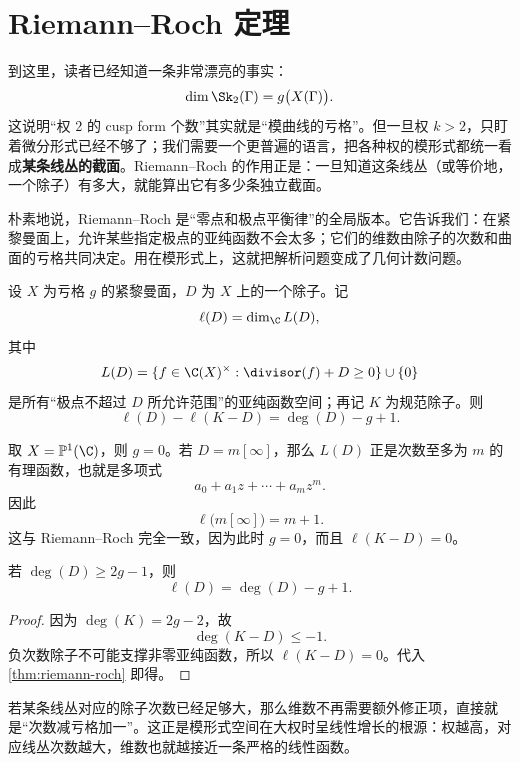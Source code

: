 \section{Riemann--Roch 定理}
\label{sec:riemann-roch}

到这里，读者已经知道一条非常漂亮的事实：
\[
  \dim \Sk_2(\Gamma)=g\bigl(X(\Gamma)\bigr).
\]
这说明“权 $2$ 的 cusp form 个数”其实就是“模曲线的亏格”。但一旦权 $k>2$，只盯着微分形式已经不够了；我们需要一个更普遍的语言，把各种权的模形式都统一看成\textbf{某条线丛的截面}。Riemann--Roch 的作用正是：一旦知道这条线丛（或等价地，一个除子）有多大，就能算出它有多少条独立截面。

朴素地说，Riemann--Roch 是“零点和极点平衡律”的全局版本。它告诉我们：在紧黎曼面上，允许某些指定极点的亚纯函数不会太多；它们的维数由除子的次数和曲面的亏格共同决定。用在模形式上，这就把解析问题变成了几何计数问题。



\begin{theorem}
\label{thm:riemann-roch}
设 $X$ 为亏格 $g$ 的紧黎曼面，$D$ 为 $X$ 上的一个除子。记
\[
  \ell(D)=\dim_{\C} L(D),
\]
其中
\[
  L(D)=\{f\in \C(X)^\times : \divisor(f)+D\ge 0\}\cup\{0\}
\]
是所有“极点不超过 $D$ 所允许范围”的亚纯函数空间；再记 $K$ 为规范除子。则
\[
  \ell(D)-\ell(K-D)=\deg(D)-g+1.
\]
\end{theorem}

\begin{example}[球面上的最简单情形]
\label{ex:rr-p1}
取 $X=\mathbb P^1(\C)$，则 $g=0$。若 $D=m[\infty]$，那么 $L(D)$ 正是次数至多为 $m$ 的有理函数，也就是多项式
\[
  a_0+a_1z+\cdots+a_mz^m.
\]
因此
\[
  \ell\bigl(m[\infty]\bigr)=m+1.
\]
这与 Riemann--Roch 完全一致，因为此时 $g=0$，而且 $\ell(K-D)=0$。
\end{example}

\begin{corollary}[大次数时的线性公式]
\label{cor:rr-large-degree}
若 $\deg(D)\ge 2g-1$，则
\[
  \ell(D)=\deg(D)-g+1.
\]
\end{corollary}

\begin{proof}
因为 $\deg(K)=2g-2$，故
\[
  \deg(K-D)\le -1.
\]
负次数除子不可能支撑非零亚纯函数，所以 $\ell(K-D)=0$。代入 \cref{thm:riemann-roch} 即得。
\end{proof}

\begin{example}[为什么这条推论适合计维数]
\label{ex:rr-count-sections}
若某条线丛对应的除子次数已经足够大，那么维数不再需要额外修正项，直接就是“次数减亏格加一”。这正是模形式空间在大权时呈线性增长的根源：权越高，对应线丛次数越大，维数也就越接近一条严格的线性函数。
\end{example}

